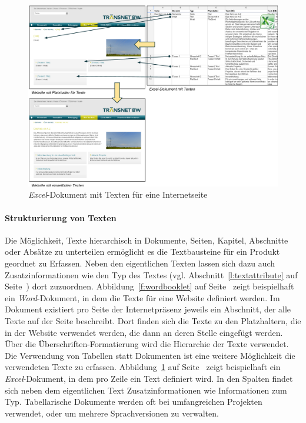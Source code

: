 \begin{figure}[htb]
\begin{center}
\includegraphics[width=\textwidth]{media/Textbooklet-Excel-Dokument.pdf}
\end{center}
\caption{\emph{Excel}-Dokument mit Texten für eine Internetseite}
\label{f:excelbooklet}
\end{figure}

\paragraph{Strukturierung von Texten} Die Möglichkeit, Texte hierarchisch in Dokumente, Seiten, Kapitel, Abschnitte oder Absätze zu unterteilen ermöglicht es die Textbausteine für ein Produkt geordnet zu Erfassen. Neben den eigentlichen Texten lassen sich dazu auch Zusatzinformationen wie den Typ des Textes
(vgl. Abschnitt~\ref{l:textattribute} auf Seite~\pageref{l:textattribute}) dort zuzuordnen. Abbildung~\ref{f:wordbooklet} auf Seite~\pageref{f:wordbooklet} zeigt beispielhaft ein \emph{Word}-Dokument, in dem die Texte für eine Website definiert werden. Im Dokument existiert pro Seite der Internetpräsenz jeweils ein Abschnitt, der alle Texte auf der Seite beschreibt. Dort finden sich die Texte zu den Platzhaltern, die in der Website verwendet werden, die dann an deren Stelle eingefügt werden. Über die Überschriften-Formatierung wird die Hierarchie der Texte verwendet. Die Verwendung von Tabellen statt Dokumenten ist eine weitere Möglichkeit die verwendeten Texte zu erfassen. Abbildung~\ref{f:excelbooklet} auf Seite~\pageref{f:excelbooklet} zeigt beispielhaft ein \emph{Excel}-Dokument, in dem pro Zeile ein Text definiert wird. In den Spalten findet sich neben dem eigentlichen Text Zusatzinformationen wie Informationen zum Typ. Tabellarische Dokumente werden oft bei umfangreichen Projekten verwendet, oder um mehrere Sprachversionen zu verwalten.

